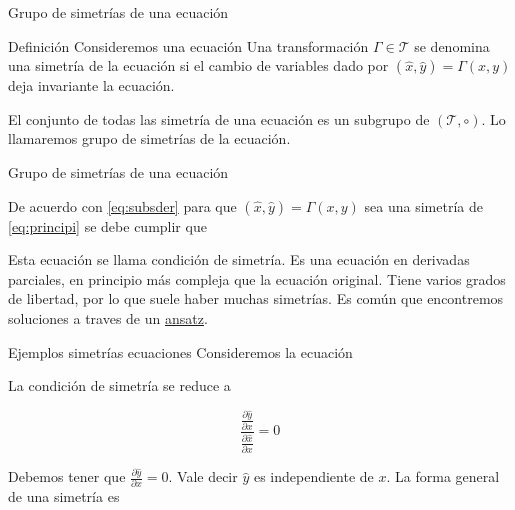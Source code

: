 \documentclass[handout,hyperref={colorlinks=true}]{beamer}
\renewcommand{\emph}[1]{\textcolor[rgb]{1,0,0}{#1}}
\newcommand{\nl}{\onslide<+-> }
\begin{document}
\begin{frame}{Grupo de simetrías de una ecuación}

\begin{block}{Definición}
\nl Consideremos una ecuación
Una transformación $\Gamma\in \mathscr{T}$ se denomina una simetría de la ecuación si el cambio de variables dado por $(\hat{x},\hat{y})=\Gamma(x,y)$ deja invariante  la ecuación. 

\nl El conjunto de todas las simetría de una ecuación es un subgrupo de  $( \mathscr{T},\circ)$. Lo llamaremos \emph{grupo de simetrías} de la ecuación.

 

\end{block}


\end{frame}


\begin{frame}{Grupo de simetrías de una ecuación}

\nl De acuerdo con \eqref{eq:subsder} para que $(\hat{x},\hat{y})=\Gamma(x,y)$ sea una simetría de \eqref{eq:principi} se debe cumplir que

\nl Esta ecuación se llama \emph{condición de simetría}. Es una ecuación en derivadas parciales, en principio más compleja que la ecuación original. Tiene varios grados de libertad, por lo que suele haber muchas simetrías.  Es común que encontremos soluciones a  traves de un  \href{http://es.wikipedia.org/wiki/Ansatz}{ansatz}.

\end{frame}



\begin{frame}{Ejemplos simetrías ecuaciones }
Consideremos la ecuación

La condición de simetría se reduce a 

\[
\frac{\frac{\partial\hat{y}}{\partial x}}{\frac{\partial\hat{x}}{\partial x}}=0
\]

Debemos tener que $\frac{\partial\hat{y}}{\partial x}=0$. Vale decir $\hat{y}$ es independiente de $x$. La forma general de una simetría es

\end{frame}
\end{document}

